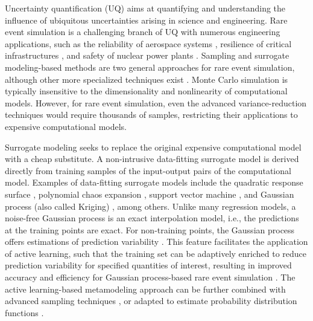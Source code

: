 \documentclass[number,preprint,3p]{elsarticle}
\newcommand{\1}[2]{\mathbb{I}_{#1}\left(#2\right)}
\begin{document}
	\noindent Uncertainty quantification (UQ) aims at quantifying and understanding the influence of ubiquitous uncertainties arising in science and engineering. Rare event simulation is a challenging branch of UQ with numerous engineering applications, such as the reliability of aerospace systems \cite{morio2015estimation}, resilience of critical infrastructures \cite{zio2021risk}, and safety of nuclear power plants \cite{jiang2021triso}. Sampling and surrogate modeling-based methods are two general approaches for rare event simulation, although other more specialized techniques exist \cite{dang2020mixture,xu2022adaptive,li2009stochastic,chen2019direct,xian2021seismic,lyu2022unified}.  Monte Carlo simulation \cite{rubinstein1998modern,landau2015guide} is typically insensitive to the dimensionality and nonlinearity of computational models. However, for rare event simulation, even the advanced variance-reduction techniques \cite{au2001estimation,kurtz2013cross,wang2016cross,engel2023bayesian,grigoriu2020data,papaioannou2016sequential,wang2019hamiltonian,xian2023relaxation} would require thousands of samples, restricting their applications to expensive computational models. 
	
	Surrogate modeling seeks to replace the original expensive computational model with a cheap substitute. A non-intrusive data-fitting surrogate model is derived directly from training  samples of the input-output pairs of the  computational model. Examples of data-fitting surrogate models include the quadratic response surface \cite{rajashekhar1993new,allaix2011improvement}, polynomial chaos expansion \cite{sudret2002comparison,torre2019data}, support vector machine \cite{hurtado2004examination,roy2023support}, and Gaussian process (also called Kriging) \cite{kaymaz2005application}, among others. Unlike many regression models, a noise-free Gaussian process is an exact interpolation model, i.e., the predictions at the training points are exact. For non-training points, the Gaussian process offers estimations of prediction variability \cite{jones2001taxonomy,sudret2012meta}. This feature facilitates the application of active learning, such that the training set can be adaptively enriched to reduce prediction variability for specified quantities of interest, resulting in improved accuracy and efficiency for Gaussian process-based rare event simulation \cite{bichon2008efficient,echard2011ak}. The active learning-based metamodeling approach can be further combined with advanced sampling techniques \cite{echard2013combined,huang2016assessing}, or adapted to estimate probability distribution functions \cite{wang2020novel}. 
 
\end{document}
